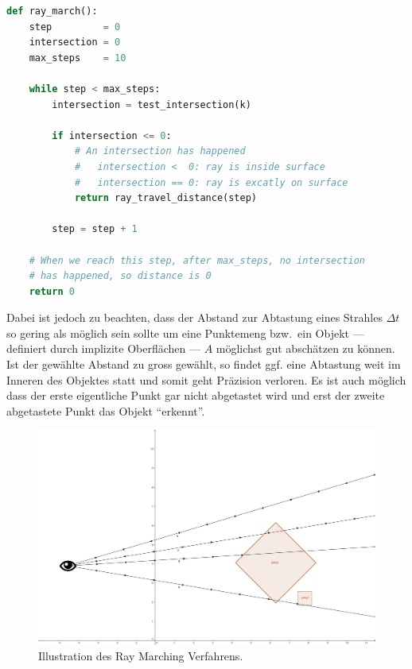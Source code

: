 \begin{lstlisting}[language=Python,caption={Eine abstrakte Umsetzung des Ray
        Marchings\protect\footnotemark.},label={fig:ray_marching},captionpos=b,emph={ray_march}]
def ray_march():
    step         = 0
    intersection = 0
    max_steps    = 10

    while step < max_steps:
        intersection = test_intersection(k)

        if intersection <= 0:
            # An intersection has happened
            #   intersection <  0: ray is inside surface
            #   intersection == 0: ray is excatly on surface
            return ray_travel_distance(step)

        step = step + 1

    # When we reach this step, after max_steps, no intersection
    # has happened, so distance is 0
    return 0
\end{lstlisting}

Dabei ist jedoch zu beachten, dass der Abstand zur Abtastung eines Strahles
$\Delta t$ so gering als möglich sein sollte um eine Punktemeng bzw.\ ein
Objekt --- definiert durch implizite Oberflächen --- $A$ möglichst gut
abschätzen zu können. Ist der gewählte Abstand zu gross gewählt, so findet ggf.
eine Abtastung weit im Inneren des Objektes statt und somit geht Präzision
verloren.  Es ist auch möglich dass der erste eigentliche Punkt gar nicht
abgetastet wird und erst der zweite abgetastete Punkt das Objekt ``erkennt''.

\begin{figure}[H]
    \caption{Illustration des Ray Marching Verfahrens.\protect\footnotemark}\label{fig:ray_marching_problems}
    \centering
    \includegraphics[width=1.0\textwidth]{img/ray_marching_problems.png}
\end{figure}

